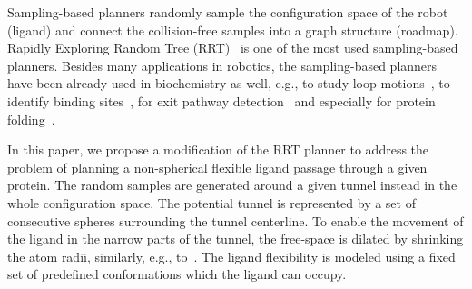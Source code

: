 \documentclass[usletter, 10pt, conference]{ieeeconf} %
\begin{document}
Sampling-based planners randomly sample the configuration space of the robot (ligand) and connect the collision-free samples
into a graph structure (roadmap).
Rapidly Exploring Random Tree (RRT)~\cite{lavalleRRT} is one of the most used sampling-based planners.
Besides many applications in robotics, the sampling-based planners have been already used in biochemistry as well, 
e.g., to study loop motions~\cite{cortes2004geometric}, to identify binding sites~\cite{bayazit2001ligand}, for exit
pathway detection~\cite{cortes2010simulating,cortes2005path} and especially for protein folding~\cite{raveh2009rapid,amato2002using}. %


In this paper, we propose a modification of the RRT planner to address the problem of planning a non-spherical flexible ligand passage through a given protein.
The random samples are generated around a given tunnel instead in the whole configuration space.
The potential tunnel is represented by a set of consecutive spheres surrounding the tunnel centerline.
To enable the movement of the ligand in the narrow parts of the tunnel, the free-space is dilated by shrinking the atom radii, similarly, e.g., to~\cite{hsu06multilevel}.  %
The ligand flexibility is modeled using a fixed set of predefined conformations which the ligand can occupy.
\end{document}
